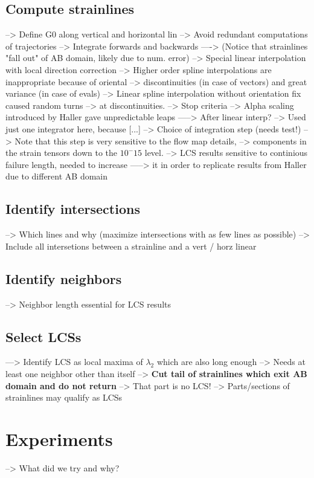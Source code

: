 \section{Compute strainlines}
--> Define G0 along vertical and horizontal lin
--> Avoid redundant computations of trajectories
--> Integrate forwards and backwards
----> (Notice that strainlines "fall out" of AB domain, likely due to num. error)
--> Special linear interpolation with local direction correction
--> Higher order spline interpolations are inappropriate because of oriental
--> discontinuities (in case of vectors) and great variance (in case of evals)
--> Linear spline interpolation without orientation fix caused random turns
--> at discontinuities.
--> Stop criteria
--> Alpha scaling introduced by Haller gave unpredictable leaps
-----> After linear interp?
--> Used just one integrator here, because [...]
--> Choice of integration step (needs test!)
--> Note that this step is very sensitive to the flow map details,
--> components in the strain tensors down to the $10^-15$ level.
--> LCS results sensitive to continious failure length, needed to increase
-----> it in order to replicate results from Haller due to different AB domain

\section{Identify intersections}
--> Which lines and why (maximize intersections with as few lines as possible)
--> Include all intersetions between a strainline and a vert / horz linear

\section{Identify neighbors}
--> Neighbor length essential for LCS results

\section{Select LCSs}
---> Identify LCS as local maxima of $\lambda_{2}$ which are also long enough
--> Needs at least one neighbor other than itself
--> \textbf{Cut tail of strainlines which exit AB domain and do not return}
--> That part is no LCS!
--> Parts/sections of strainlines may qualify as LCSs

\chapter{Experiments}
--> What did we try and why?
